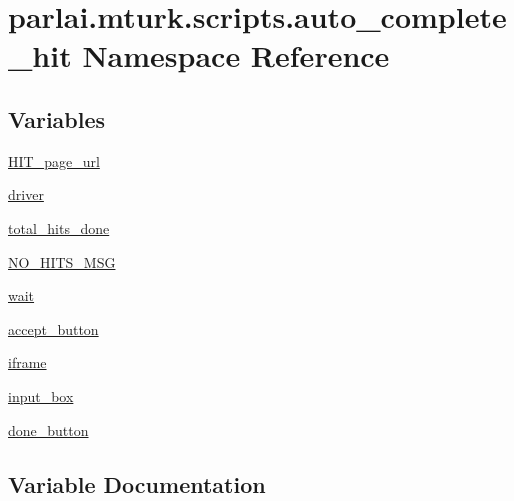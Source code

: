 \hypertarget{namespaceparlai_1_1mturk_1_1scripts_1_1auto__complete__hit}{}\section{parlai.\+mturk.\+scripts.\+auto\+\_\+complete\+\_\+hit Namespace Reference}
\label{namespaceparlai_1_1mturk_1_1scripts_1_1auto__complete__hit}
\subsection*{Variables}
\begin{DoxyCompactItemize}
\item 
\hyperlink{namespaceparlai_1_1mturk_1_1scripts_1_1auto__complete__hit_ad6ca26b2f1c966bd00304cb47a612bd4}{H\+I\+T\+\_\+page\+\_\+url}
\item 
\hyperlink{namespaceparlai_1_1mturk_1_1scripts_1_1auto__complete__hit_aa84d687a4e23d5c4cb07ab0c07396a5c}{driver}
\item 
\hyperlink{namespaceparlai_1_1mturk_1_1scripts_1_1auto__complete__hit_a9a736751172ead55dccc9ab1801d7002}{total\+\_\+hits\+\_\+done}
\item 
\hyperlink{namespaceparlai_1_1mturk_1_1scripts_1_1auto__complete__hit_afea89b23971b7acc4b84c3044d671f93}{N\+O\+\_\+\+H\+I\+T\+S\+\_\+\+M\+SG}
\item 
\hyperlink{namespaceparlai_1_1mturk_1_1scripts_1_1auto__complete__hit_a41016a44ce805b615732efe5c479551c}{wait}
\item 
\hyperlink{namespaceparlai_1_1mturk_1_1scripts_1_1auto__complete__hit_afebd2d6c99ba96ac7f06da75a096702f}{accept\+\_\+button}
\item 
\hyperlink{namespaceparlai_1_1mturk_1_1scripts_1_1auto__complete__hit_a34e374bb9e9600346544be6a7feeb6c2}{iframe}
\item 
\hyperlink{namespaceparlai_1_1mturk_1_1scripts_1_1auto__complete__hit_ac373c84090ad4712c390633f7ff3bb77}{input\+\_\+box}
\item 
\hyperlink{namespaceparlai_1_1mturk_1_1scripts_1_1auto__complete__hit_a5a46afcb5e8b24725e3dbbc7fee116aa}{done\+\_\+button}
\end{DoxyCompactItemize}


\subsection{Variable Documentation}
\mbox{\label{namespaceparlai_1_1mturk_1_1scripts_1_1auto__complete__hit_afebd2d6c99ba96ac7f06da75a096702f}} 
